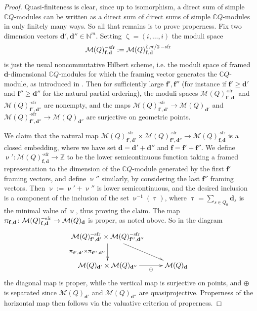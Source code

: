 \documentclass[a4paper,10pt]{amsart}
\newcommand{\dd}{\mathbf{d}}
\newcommand{\ff}{\mathbf{f}}
\DeclareMathOperator{\sfr}{-sfr}
\newcommand{\Msp}{\mathcal{M}}
\renewcommand{\zeta}{\upzeta}
\renewcommand{\pi}{\uppi\hspace{0.05em}}
\renewcommand{\nu}{\upnu}
\renewcommand{\tau}{\uptau}
\begin{document}
\begin{proof}
Quasi-finiteness is clear, since up to isomorphism, a direct sum of simple $\mathbb{C}Q$-modules can be written as a direct sum of direct sums of simple $\mathbb{C}Q$-modules in only finitely many ways.  So all that remains is to prove properness.  Fix two dimension vectors $\dd',\dd''\in\mathbb{N}^{m}$.  Setting $\zeta=(i,\ldots,i)$ the moduli space 
\[
\Msp(Q)_{\ff,\dd}^{\sfr}:=\Msp(Q)_{\ff,\dd}^{\zeta, \pi/2\sfr}
\]
is just the usual noncommutative Hilbert scheme, i.e. the moduli space of framed $\dd$-dimensional $\mathbb{C}Q$-modules for which the framing vector generates the $\mathbb{C}Q$-module, as introduced in \cite{Re05}.  Then for sufficiently large $\ff',\ff''$ (for instance if $\ff'\geq \dd'$ and $\ff''\geq \dd''$ for the natural partial ordering), the moduli spaces $\Msp(Q)^{\sfr}_{\ff',\dd'}$ and $\Msp(Q)^{\sfr}_{\ff'',\dd''}$ are nonempty, and the maps $\Msp(Q)^{\sfr}_{\ff',\dd'}\rightarrow \Msp(Q)_{\dd'}$ and $\Msp(Q)^{\sfr}_{\ff'',\dd''}\rightarrow \Msp(Q)_{\dd''}$ are surjective on geometric points.  

We claim that the natural map $\Msp(Q)^{\sfr}_{\ff',\dd'}\times \Msp(Q)^{\sfr}_{\ff'',\dd''}\rightarrow \Msp(Q)^{\sfr}_{\ff,\dd}$ is a closed embedding, where we have set $\dd=\dd'+\dd''$ and $\ff=\ff'+\ff''$.  We define $\nu'\colon\Msp(Q)^{\sfr}_{\ff,\dd}\rightarrow \mathbb{Z}$ to be the lower semicontinuous function taking a framed representation to the dimension of the $\mathbb{C}Q$-module generated by the first $\ff'$ framing vectors, and define $\nu''$ similarly, by considering the last $\ff''$ framing vectors.  Then $\nu:=\nu'+\nu''$ is lower semicontinuous, and the desired inclusion is a component of the inclusion of the set $\nu^{-1}(\tau)$, where $\tau=\sum_{s\in Q_0}\dd_s$ is the minimal value of $\nu$, thus proving the claim.  The map $\pi_{\ff,\dd}\colon\Msp(Q)^{\sfr}_{\ff,\dd}\rightarrow \Msp(Q)_{\dd}$ is proper, as noted above.  So in the diagram
\[
\xymatrix{
\Msp(Q)^{\sfr}_{\ff',\dd'}\times\Msp(Q)^{\sfr}_{\ff'',\dd''}\ar[dr]\ar[d]_-{\pi_{\ff',\dd'}\times\pi_{\ff'',\dd''}} \\\Msp(Q)_{\dd'}\times\Msp(Q)_{\dd''}\ar[r]_-{\oplus} &\Msp(Q)_{\dd}
}
\]
the diagonal map is proper, while the vertical map is surjective on points, and $\oplus$ is separated since $\Msp(Q)_{\dd'}$ and $\Msp(Q)_{\dd''}$ are quasiprojective.  Properness of the horizontal map then follows via the valuative criterion of properness.
\end{proof}
\end{document}
